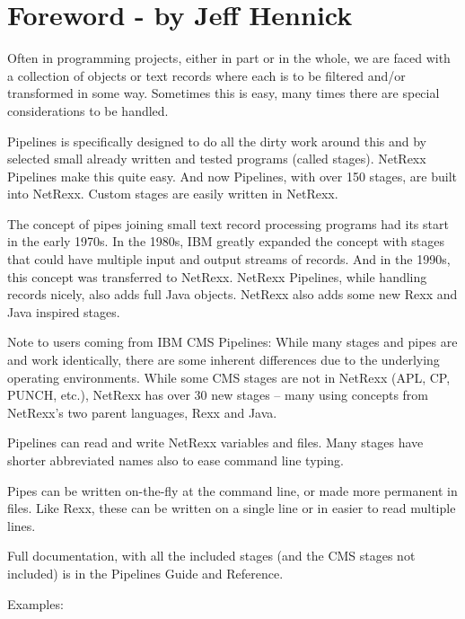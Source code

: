 \chapter*{Foreword - by Jeff Hennick}
Often in programming projects, either in part or in the whole, we are faced with a collection of objects or text records where each is to be filtered and/or transformed in some way. Sometimes this is easy, many times there are special considerations to be handled.

Pipelines is specifically designed to do all the dirty work around this and by selected small already written and tested programs (called stages).  NetRexx Pipelines make this quite easy. And now Pipelines, with over 150 stages, are built into NetRexx. Custom stages are easily written in NetRexx.

The concept of pipes joining small text record processing programs had
its start in the early 1970s. In the 1980s, IBM greatly expanded the concept with stages that could have multiple input and output streams of records.  And in the 1990s, this concept was transferred to NetRexx. NetRexx Pipelines, while handling records nicely, also adds full Java objects.  NetRexx also adds some new Rexx and Java inspired stages.

\begin{shaded}
Note to users coming from IBM CMS Pipelines: While many stages and pipes are and work identically, there are some inherent differences due to the underlying operating environments. While some CMS stages are not in NetRexx (APL, CP, PUNCH, etc.), NetRexx has over 30 new stages -- many using concepts from NetRexx's two parent languages, Rexx and Java.
\end{shaded}

Pipelines can read and write NetRexx variables and files. Many stages have shorter abbreviated names also to ease command line typing.

Pipes can be written on-the-fly at the command line, or made more permanent in files. Like Rexx, these can be written on a single line or in easier to read multiple lines.

Full documentation, with all the included stages (and the CMS stages not included) is in the Pipelines Guide and Reference.

Examples:

